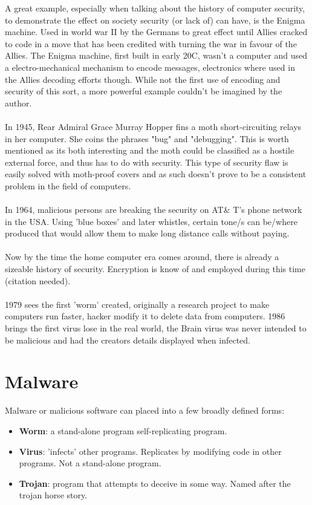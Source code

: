 A great example, especially when talking about the history of computer security, to demonstrate the effect on society security (or lack of) can have, is the Enigma machine. Used in world war II by the Germans to great effect until Allies cracked to code in a move that has been credited with turning the war in favour of the Allies. The Enigma machine, first built in early 20C, wasn't a computer and used a electro-mechanical mechanism to encode messages, electronics where used in the Allies decoding efforts though. While not the first use of encoding and security of this sort, a more powerful example couldn't be imagined by the author. \\\\

In 1945, Rear Admiral Grace Murray Hopper fins a moth short-circuiting relays in her computer. She coins the phrases "bug" and "debugging". This is worth mentioned as its both interesting and the moth could be classified as a hostile external force, and thus has to do with security. This type of security flaw is easily solved with moth-proof covers and as such doesn't prove to be a consistent problem in the field of computers. \\\\

In 1964, malicious persons are breaking the security on AT\& T's phone network in the USA. Using 'blue boxes' and later whistles, certain tone/s can be/where produced that would allow them to make long distance calls without paying. \\\\

Now by the time the home computer era comes around, there is already a sizeable history of security. Encryption is know of and employed during this time (citation needed). \\\\

 1979 sees the first 'worm' created, originally a research project to make computers run faster, hacker modify it to delete data from computers.  1986 brings the first virus lose in the real world, the Brain virus was never intended to be malicious and had the creators details displayed when infected.

\section{Malware}
Malware or malicious software can placed into a few broadly defined forms:
\begin{itemize}
\item \textbf{Worm}: a stand-alone program self-replicating program.\\
\item \textbf{Virus}: 'infects' other programs. Replicates by modifying code in other programs. Not a stand-alone program.
\item \textbf{Trojan}: program that attempts to deceive in some way. Named after the trojan horse story.
\end{itemize}

